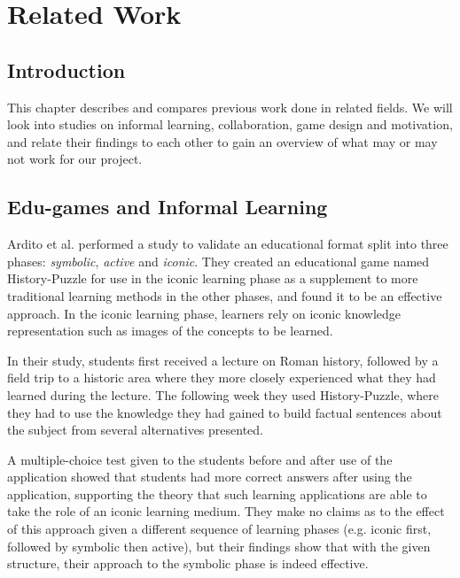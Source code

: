 
\chapter{Related Work}

\label{Chapter2}



\section{Introduction}

This chapter describes and compares previous work done in related fields. We will look into studies on informal learning, collaboration, game design and motivation, and relate their findings to each other to gain an overview of what may or may not work for our project.


\section{Edu-games and Informal Learning}

Ardito et al.\citep{Ardito} performed a study to validate an educational format split into three phases: \emph{symbolic}, \emph{active} and \emph{iconic}. They created an educational game named History-Puzzle for use in the iconic learning phase as a supplement to more traditional learning methods in the other phases, and found it to be an effective approach. In the iconic learning phase, learners rely on iconic knowledge representation such as images of the concepts to be learned.

In their study, students first received a lecture on Roman history, followed by a field trip to a historic area where they more closely experienced what they had learned during the lecture. The following week they used History-Puzzle, where they had to use the knowledge they had gained to build factual sentences about the subject from several alternatives presented.

A multiple-choice test given to the students before and after use of the application showed that students had more correct answers after using the application, supporting the theory that such learning applications are able to take the role of an iconic learning medium. They make no claims as to the effect of this approach given a different sequence of learning phases (e.g. iconic first, followed by symbolic then active), but their findings show that with the given structure, their approach to the symbolic phase is indeed effective.

